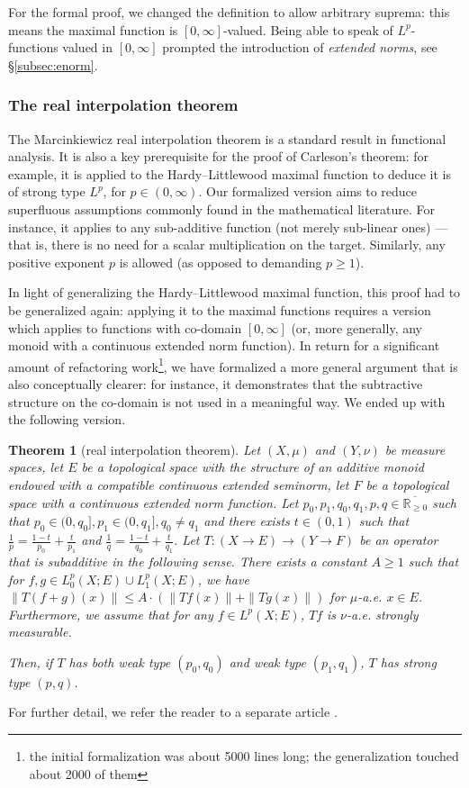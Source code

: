 \documentclass[12pt]{amsart}
\newcommand*{\real}{\mathbb{R}} %
\newcommand{\ennreal}{\overline{\real_{\ge0}}}
\theoremstyle{definition}
\theoremstyle{plain}
\newtheorem{theorem}{Theorem}[subsection]
\begin{document}
For the formal proof, we changed the definition to allow arbitrary suprema: this means the maximal function is $[0,\infty]$-valued. Being able to speak of $L^p$-functions valued in $[0,\infty]$ prompted the introduction of \emph{extended norms}, see \S\ref{subsec:enorm}.

\subsubsection{The real interpolation theorem}\label{subsubsec:real_interpolation}
The Marcinkiewicz real interpolation theorem is a standard result in functional analysis.
It is also a key prerequisite for the proof of Carleson's theorem: for example, it is applied to the Hardy–Littlewood maximal function to deduce it is of strong type $L^p$, for $p\in(0,\infty)$.
Our formalized version aims to reduce superfluous assumptions commonly found in the mathematical literature. For instance, it applies to any sub-additive function (not merely sub-linear ones) --- that is, there is no need for a scalar multiplication on the target. Similarly, any positive exponent $p$ is allowed (as opposed to demanding $p\geq 1$).

In light of generalizing the Hardy--Littlewood maximal function, this proof had to be generalized again:
applying it to the maximal functions requires a version which applies to functions with co-domain $[0, \infty]$ (or, more generally, any monoid with a continuous extended norm function).
In return for a significant amount of refactoring work\footnote{the initial formalization was about 5000 lines long; the generalization touched about 2000 of them},
we have formalized a more general argument that is also conceptually clearer: for instance, it demonstrates that the subtractive structure on the co-domain is not used in a meaningful way. We ended up with the following version.
\begin{theorem}[real interpolation theorem]
    Let $(X,\mu)$ and $(Y,\nu)$ be measure spaces, let $E$ be a topological space with the structure of an additive monoid endowed with a compatible continuous extended seminorm, let $F$ be a topological space with a continuous extended norm function.
    Let $p_0, p_1, q_0, q_1, p, q \in \ennreal$ such that $p_0 \in (0,q_0], p_1 \in (0,q_1], q_0 \ne q_1$ and there exists $t \in (0,1)$ such that $\frac{1}{p} = \frac{1-t}{p_0} + \frac{t}{p_1}$ and $\frac{1}{q} = \frac{1-t}{q_0} + \frac{t}{q_1}$.
    Let $T : (X \to E) \to (Y \to F)$ be an operator that is subadditive in the following sense. There exists a constant $A \ge 1$ such that for $f, g \in L^p_0(X; E) \cup L^p_1(X; E)$, we have $\|T(f+g)(x)\| \le A \cdot \left(\|Tf(x)\| + \|Tg(x)\|\right)$ for $\mu$-a.e. $x\in E$. Furthermore, we assume that for any $f\in L^p(X;E)$, $T f$ is $\nu$-a.e. strongly measurable.

    Then, if $T$ has both weak type $(p_0, q_0)$ and weak type $(p_1, q_1)$, $T$ has strong type $(p,q)$.
\end{theorem}
For further detail, we refer the reader to a separate article \cite{PortegiesRothgangRealInterpolation}.
\end{document}
